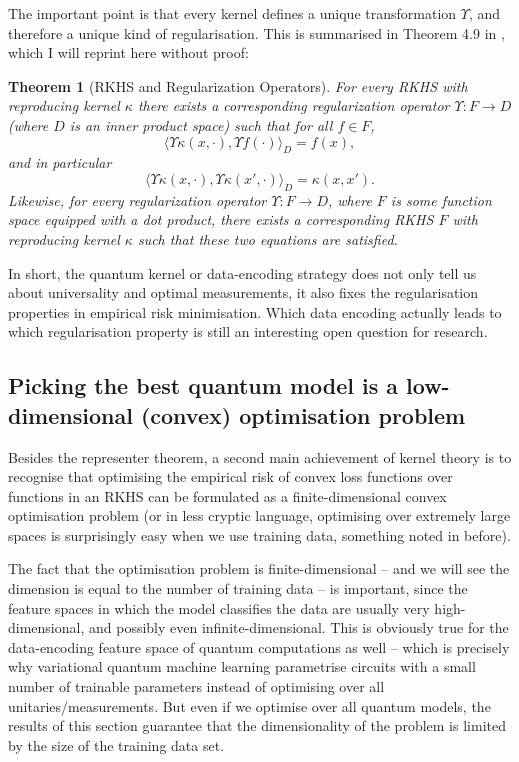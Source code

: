 \documentclass[aps, reprint, onecolumn, nofootinbib, longbibliography]{revtex4-2}
\newtheorem{theorem}{Theorem}[]
\begin{document}
The important point is that every kernel defines a unique transformation $\Upsilon$, and therefore a unique kind of regularisation. This is summarised in Theorem 4.9 in \cite{scholkopf2002learning}, which I will reprint here without proof:
\begin{theorem}[RKHS and Regularization Operators] For every RKHS with reproducing kernel $\kappa$ there exists a corresponding regularization operator $\Upsilon : F \to D$ (where $D$ is an inner product space) such that for all $f \in F$, 
 \begin{equation}
     \langle \Upsilon \kappa(x, \cdot), \Upsilon f(\cdot) \rangle_{D} = f(x),
 \end{equation}
 and in particular
 \begin{equation}\langle \Upsilon \kappa(x, \cdot), \Upsilon \kappa(x', \cdot) \rangle_{D} = \kappa(x, x').
 \end{equation}
    Likewise, for every regularization operator $\Upsilon : F\to D$, where $F$ is some function space equipped with a dot product, there exists a corresponding RKHS $F$ with reproducing kernel $\kappa$ such that these two equations are satisfied.
\end{theorem}
In short, the quantum kernel or data-encoding strategy does not only tell us about universality and optimal measurements, it also fixes the regularisation properties in empirical risk minimisation. Which data encoding actually leads to which regularisation property is still an interesting open question for research.


\subsection{Picking the best quantum model is a low-dimensional (convex) optimisation problem}\label{ssec:convex}

Besides the representer theorem, a second main achievement of kernel theory is to recognise that optimising the empirical risk of convex loss functions over functions in an RKHS can be formulated as a finite-dimensional convex optimisation problem (or in less cryptic language, optimising over extremely large spaces is surprisingly easy when we use training data, something noted in \cite{huang2020power} before). 

The fact that the optimisation problem is finite-dimensional -- and we will see the dimension is equal to the number of training data -- is important, since the feature spaces in which the model classifies the data are usually very high-dimensional, and possibly even infinite-dimensional. This is obviously true for the data-encoding feature space of quantum computations as well -- which is precisely why variational quantum machine learning parametrise circuits with a small number of trainable parameters instead of optimising over all unitaries/measurements. But even if we optimise over all quantum models, the results of this section guarantee that the dimensionality of the problem is limited by the size of the training data set. 
\end{document}
